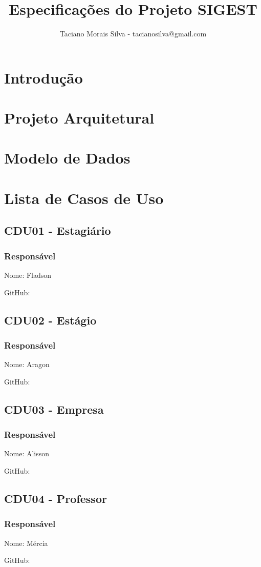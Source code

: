 \documentclass{report}
\title{Especificações do Projeto SIGEST}
\author{Taciano Morais Silva - tacianosilva@gmail.com}
\begin{document}
\maketitle
\tableofcontents

\chapter{Introdução}

\chapter{Projeto Arquitetural}

\chapter{Modelo de Dados}

\chapter{Lista de Casos de Uso}

\section{CDU01 - Estagiário}

\subsection{Responsável}

Nome: Fladson

GitHub:



\section{CDU02 - Estágio}

\subsection{Responsável}

Nome: Aragon

GitHub:



\section{CDU03 - Empresa}

\subsection{Responsável}

Nome: Alisson

GitHub:



\section{CDU04 - Professor}

\subsection{Responsável}

Nome: Mércia

GitHub:


\end{document}
